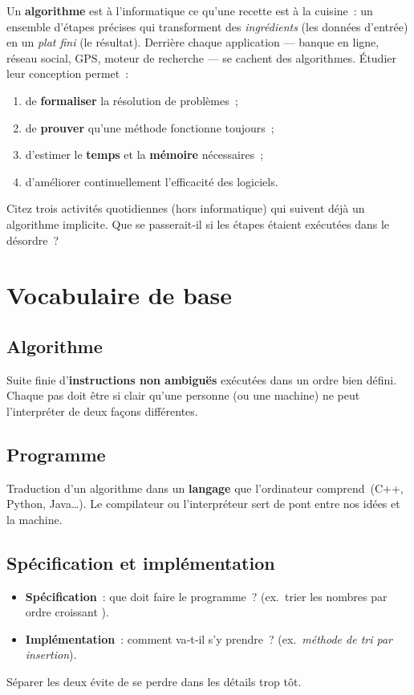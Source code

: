Un \textbf{algorithme} est à l’informatique ce qu’une recette est à la cuisine : un
ensemble d’étapes précises qui transforment des \emph{ingrédients} (les données
d’entrée) en un \emph{plat fini} (le résultat). Derrière chaque application —
banque en ligne, réseau social, GPS, moteur de recherche — se cachent des
algorithmes. Étudier leur conception permet :
\begin{enumerate}
  \item de \textbf{formaliser} la résolution de problèmes ;              %
  \item de \textbf{prouver} qu’une méthode fonctionne toujours ;        %
  \item d’estimer le \textbf{temps} et la \textbf{mémoire} nécessaires ; %
  \item d’améliorer continuellement l’efficacité des logiciels.          %
\end{enumerate}

\begin{reflexion}
Citez trois activités quotidiennes (hors informatique) qui suivent déjà un
algorithme implicite. Que se passerait‑il si les étapes étaient exécutées dans
le désordre ?
\end{reflexion}

\section{Vocabulaire de base}

\subsection{Algorithme}
Suite finie d’\textbf{instructions non ambiguës} exécutées dans un ordre bien
défini. Chaque pas doit être si clair qu’une personne (ou une machine) ne peut
l’interpréter de deux façons différentes.

\subsection{Programme}
Traduction d’un algorithme dans un \textbf{langage} que l’ordinateur
comprend (C++, Python, Java…). Le compilateur ou l’interpréteur sert de pont
entre nos idées et la machine.

\subsection{Spécification et implémentation}
\begin{itemize}
  \item \textbf{Spécification} : \og que doit faire le programme ? \fg{}
        (ex. \og trier les nombres par ordre croissant \fg).
  \item \textbf{Implémentation} : \og comment va‑t‑il s’y prendre ? \fg{}
        (ex. \emph{méthode de tri par insertion}).
\end{itemize}
Séparer les deux évite de se perdre dans les détails trop tôt.

